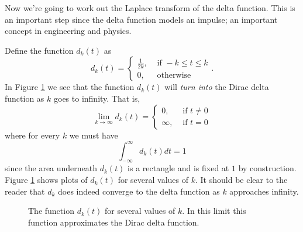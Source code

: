 Now we're going to work out the Laplace transform of the delta function.  This is an
important step since the delta function models an impulse; an important concept in
engineering and physics.  

Define the function $d_k(t)$ as 
\[ d_k(t) = \left\{ \begin{array}{cc} \frac{1}{2k}, & \text{ if } -k \le t \le k \\ 0, &
        \text{ otherwise} \end{array} \right.. \]
In Figure \ref{fig:delta_approx} we see that the function $d_k(t)$ will {\it turn
into} the Dirac delta function as $k$ goes to infinity.  That is,
\[ \lim_{k \to \infty} d_k(t) = \left\{ \begin{array}{cc} 0, & \text{ if } t \neq 0 \\ \infty, &
            \text{ if } t=0 \end{array} \right. \]
where for every $k$ we must have
\[ \int_{-\infty}^\infty d_k(t) dt = 1 \]
since the area underneath $d_k(t)$ is a rectangle and is fixed at $1$ by construction.
Figure \ref{fig:delta_approx} shows plots of $d_k(t)$ for several values of $k$.  It
should be clear to the reader that $d_k$ does indeed converge to the delta function as $k$
approaches infinity.  

\begin{figure}
    \begin{center}
    \end{center}
    \caption{The function $d_k(t)$ for several values of $k$.  In this limit this
    function approximates the Dirac delta function.}
    \label{fig:delta_approx}
\end{figure}

